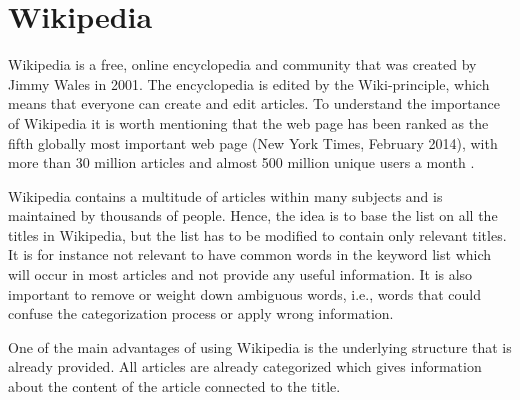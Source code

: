 \section{Wikipedia}
Wikipedia is a free, online encyclopedia and community that was created by Jimmy Wales in 2001. The encyclopedia is edited by the Wiki-principle, which means that everyone can create and edit articles. To understand the importance of Wikipedia it is worth mentioning that the web page has been ranked as the fifth globally most important web page (New York Times, February 2014), with  more than 30 million articles and almost 500 million unique users a month \cite{wiki:wikipedia}. 

Wikipedia contains a multitude of articles within many subjects and is maintained by thousands of people. Hence, the idea is to base the list on all the titles in Wikipedia, but the list has to be modified to contain only relevant titles. It is for instance not relevant to have common words in the keyword list which will occur in most articles and not provide any useful information. It is also important to remove or weight down ambiguous words, i.e., words that could confuse the categorization process or apply wrong information. 

One of the main advantages of using Wikipedia is the underlying structure that is already provided. All articles are already categorized which gives information about the content of the article connected to the title. 

